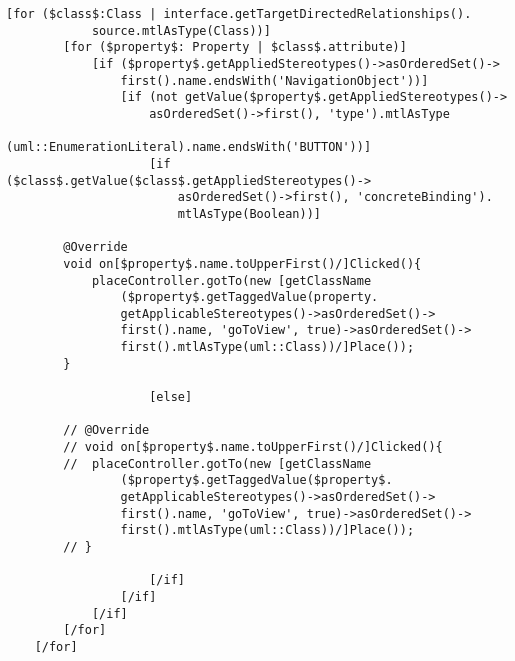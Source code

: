 \begin{lstlisting}[caption={Auszug der Generieung der \texttt{on'Name'Clicked(}-Methode}, label={BSPCodeClick}]
[for ($class$:Class | interface.getTargetDirectedRelationships().
			source.mtlAsType(Class))]
		[for ($property$: Property | $class$.attribute)]
			[if ($property$.getAppliedStereotypes()->asOrderedSet()->
				first().name.endsWith('NavigationObject'))]
				[if (not getValue($property$.getAppliedStereotypes()->
					asOrderedSet()->first(), 'type').mtlAsType
					(uml::EnumerationLiteral).name.endsWith('BUTTON'))]
					[if ($class$.getValue($class$.getAppliedStereotypes()->
						asOrderedSet()->first(), 'concreteBinding').
						mtlAsType(Boolean))]
						
		@Override
		void on[$property$.name.toUpperFirst()/]Clicked(){
			placeController.gotTo(new [getClassName
				($property$.getTaggedValue(property.
				getApplicableStereotypes()->asOrderedSet()->
				first().name, 'goToView', true)->asOrderedSet()->
				first().mtlAsType(uml::Class))/]Place());
		}

					[else]

		// @Override
		// void on[$property$.name.toUpperFirst()/]Clicked(){
		//	placeController.gotTo(new [getClassName
				($property$.getTaggedValue($property$.
				getApplicableStereotypes()->asOrderedSet()->
				first().name, 'goToView', true)->asOrderedSet()->
				first().mtlAsType(uml::Class))/]Place());
		// }

					[/if]
				[/if]
			[/if]
		[/for]
	[/for]
\end{lstlisting}

